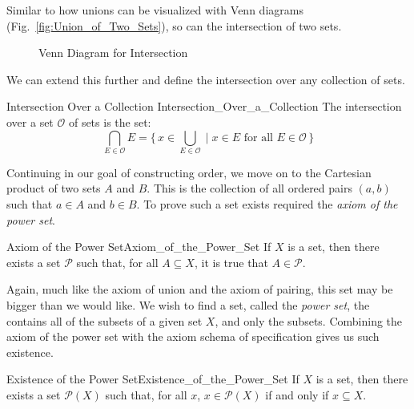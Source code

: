         Similar to how unions can be visualized with Venn diagrams
        (Fig.~\ref{fig:Union_of_Two_Sets}), so can the intersection of two sets.
        \begin{figure}[H]
            \centering
            
            \caption{Venn Diagram for Intersection}
            \label{fig:Intersection_of_Two_Sets}
        \end{figure}
        We can extend this further and define the intersection over any
        collection of sets.
        \begin{fdefinition}{Intersection Over a Collection}
                           {Intersection_Over_a_Collection}
            The intersection over a set $\mathcal{O}$ of sets is the set:
            \begin{equation}
                \bigcap_{E\in\mathcal{O}}E
                =\Big\{\,x\in\bigcup_{E\in\mathcal{O}}\;|\;x\in{E}
                    \textrm{ for all }E\in\mathcal{O}\,\Big\}
            \end{equation}
        \end{fdefinition}
        Continuing in our goal of constructing order, we move on to the
        Cartesian product of two sets $A$ and $B$. This is the collection of
        all ordered pairs $(a,b)$ such that $a\in{A}$ and $b\in{B}$. To prove
        such a set exists required the \textit{axiom of the power set}.
        \begin{faxiom}{Axiom of the Power Set}{Axiom_of_the_Power_Set}
            If $X$ is a set, then there exists a set $\mathscr{P}$ such that,
            for all $A\subseteq{X}$, it is true that $A\in\mathscr{P}$.
        \end{faxiom}
        Again, much like the axiom of union and the axiom of pairing, this set
        may be bigger than we would like. We wish to find a set, called the
        \textit{power set}, the contains all of the subsets of a given set $X$,
        and only the subsets. Combining the axiom of the power set with the
        axiom schema of specification gives us such existence.
        \begin{ltheorem}{Existence of the Power Set}{Existence_of_the_Power_Set}
            If $X$ is a set, then there exists a set $\mathcal{P}(X)$ such that,
            for all $x$, $x\in\mathcal{P}(X)$ if and only if $x\subseteq{X}$.
        \end{ltheorem}

